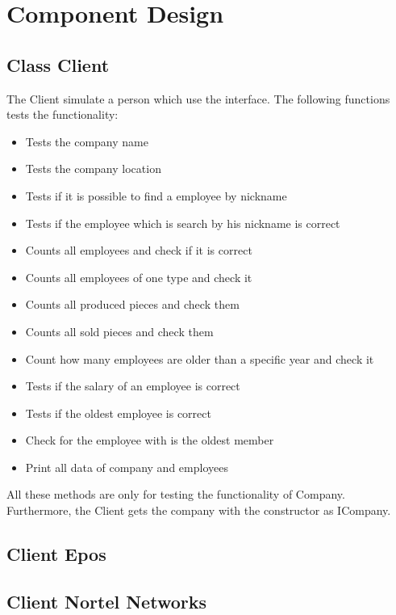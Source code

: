 \subsubsection{}


\section{Component Design}
\subsection{Class Client}
The Client simulate a person which use the interface.
The following functions tests the functionality:
\begin{itemize}
	\item Tests the company name
	\item Tests the company location
	\item Tests if it is possible to find a employee by nickname
	\item Tests if the employee which is search by his nickname is correct
	\item Counts all employees and check if it is correct
	\item Counts all employees of one type and check it
	\item Counts all produced pieces and check them
	\item Counts all sold pieces and check them
	\item Count how many employees are older than a specific year and check it
	\item Tests if the salary of an employee is correct
	\item Tests if the oldest employee is correct
	\item Check for the employee with is the oldest member
	\item Print all data of company and employees
\end{itemize}

All these methods are only for testing the functionality of Company. Furthermore, the Client gets the company with the constructor as ICompany.

\subsection{Client Epos}
\subsection{Client Nortel Networks}
